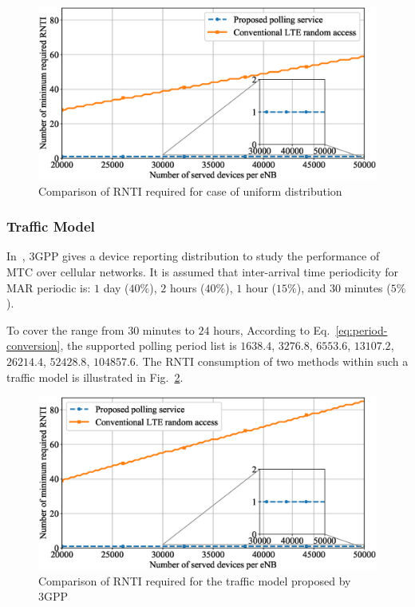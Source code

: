 \begin{figure}[!t]
	\centering
	\includegraphics[width=\linewidth]{Chapter6/Figures/uniform_RNTI_consumption_comparison.eps}
	\caption{Comparison of RNTI required for case of uniform distribution}
	\label{fig:uniform-RNTI-consumption}
\end{figure}

\subsubsection{Traffic Model~\cite[Annex E]{3GPP/cellularIoT}}
In~\cite[Annex E]{3GPP/cellularIoT}, 3GPP gives a device reporting distribution to study the performance of MTC over cellular networks. It is assumed that inter-arrival time periodicity for MAR periodic is: $1$ day ($40\%$), $2$ hours ($40\%$), $1$ hour ($15\%$), and $30$ minutes ($5\%$). 

To cover the range from $30$ minutes to $24$ hours, According to Eq.~\eqref{eq:period-conversion}, the supported polling period list is $1638.4$,  $3276.8$,    $6553.6$,  $13107.2$,   $26214.4$,   $52428.8$,  $104857.6$. The RNTI consumption of two methods within such a traffic model is illustrated in Fig.~\ref{fig:3GPP_traffic_model_RNTI_consumption_comparison}. 
\begin{figure}[!t]
	\centering
	\includegraphics[width=\linewidth]{Chapter6/Figures/3GPP_traffic_model_RNTI_consumption_comparison.eps}
	\caption{Comparison of RNTI required for the traffic model proposed by 3GPP}
	\label{fig:3GPP_traffic_model_RNTI_consumption_comparison}
\end{figure}


